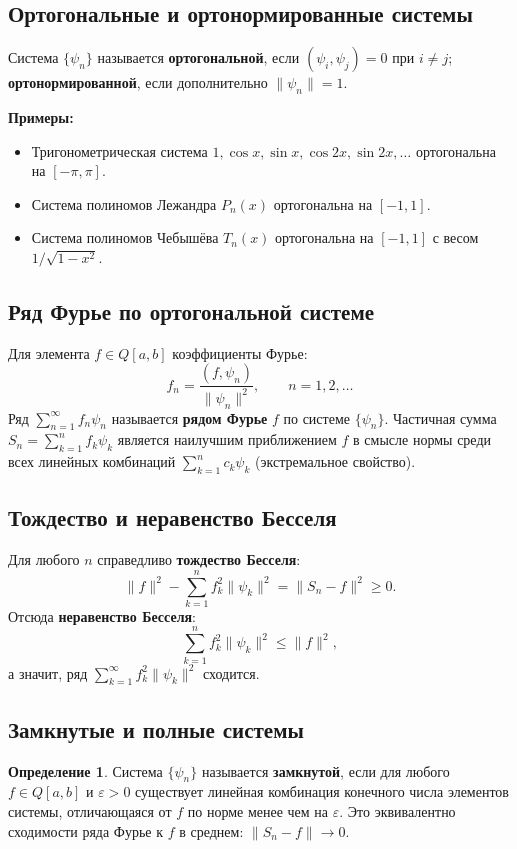 \documentclass{article}
\theoremstyle{definition}
\newtheorem{definition}{Определение}
\begin{document}
\subsection{Ортогональные и ортонормированные системы}
Система $\{\psi_n\}$ называется \textbf{ортогональной}, если $(\psi_i,\psi_j)=0$ при $i\ne j$; \textbf{ортонормированной}, если дополнительно $\|\psi_n\|=1$.

\textbf{Примеры:}
\begin{itemize}
    \item Тригонометрическая система $1,\cos x,\sin x,\cos 2x,\sin 2x,\dots$ ортогональна на $[-\pi,\pi]$.
    \item Система полиномов Лежандра $P_n(x)$ ортогональна на $[-1,1]$.
    \item Система полиномов Чебышёва $T_n(x)$ ортогональна на $[-1,1]$ с весом $1/\sqrt{1-x^2}$.
\end{itemize}

\subsection{Ряд Фурье по ортогональной системе}
Для элемента $f\in Q[a,b]$ коэффициенты Фурье:
\[
f_n = \frac{(f,\psi_n)}{\|\psi_n\|^2},\qquad n=1,2,\dots
\]
Ряд $\sum_{n=1}^{\infty} f_n\psi_n$ называется \textbf{рядом Фурье} $f$ по системе $\{\psi_n\}$. Частичная сумма $S_n=\sum_{k=1}^n f_k\psi_k$ является наилучшим приближением $f$ в смысле нормы среди всех линейных комбинаций $\sum_{k=1}^n c_k\psi_k$ (экстремальное свойство).

\subsection{Тождество и неравенство Бесселя}
Для любого $n$ справедливо \textbf{тождество Бесселя}:
\[
\|f\|^2 - \sum_{k=1}^n f_k^2\|\psi_k\|^2 = \|S_n-f\|^2 \ge 0.
\]
Отсюда \textbf{неравенство Бесселя}:
\[
\sum_{k=1}^n f_k^2\|\psi_k\|^2 \le \|f\|^2,
\]
а значит, ряд $\sum_{k=1}^{\infty} f_k^2\|\psi_k\|^2$ сходится.

\subsection{Замкнутые и полные системы}
\begin{definition}
Система $\{\psi_n\}$ называется \textbf{замкнутой}, если для любого $f\in Q[a,b]$ и $\varepsilon>0$ существует линейная комбинация конечного числа элементов системы, отличающаяся от $f$ по норме менее чем на $\varepsilon$. Это эквивалентно сходимости ряда Фурье к $f$ в среднем: $\|S_n-f\|\to0$.
\end{definition}
\end{document}
